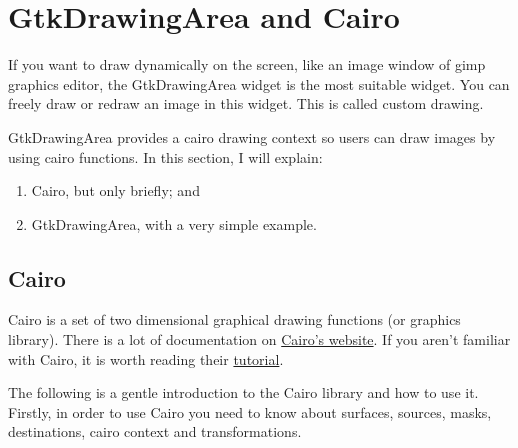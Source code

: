 \hypertarget{gtkdrawingarea-and-cairo}{%
\section{GtkDrawingArea and Cairo}\label{gtkdrawingarea-and-cairo}}

If you want to draw dynamically on the screen, like an image window of
gimp graphics editor, the GtkDrawingArea widget is the most suitable
widget. You can freely draw or redraw an image in this widget. This is
called custom drawing.

GtkDrawingArea provides a cairo drawing context so users can draw images
by using cairo functions. In this section, I will explain:

\begin{enumerate}
\def\labelenumi{\arabic{enumi}.}
\tightlist
\item
  Cairo, but only briefly; and
\item
  GtkDrawingArea, with a very simple example.
\end{enumerate}

\hypertarget{cairo}{%
\subsection{Cairo}\label{cairo}}

Cairo is a set of two dimensional graphical drawing functions (or
graphics library). There is a lot of documentation on
\href{https://www.cairographics.org/}{Cairo's website}. If you aren't
familiar with Cairo, it is worth reading their
\href{https://www.cairographics.org/tutorial/}{tutorial}.

The following is a gentle introduction to the Cairo library and how to
use it. Firstly, in order to use Cairo you need to know about surfaces,
sources, masks, destinations, cairo context and transformations.

